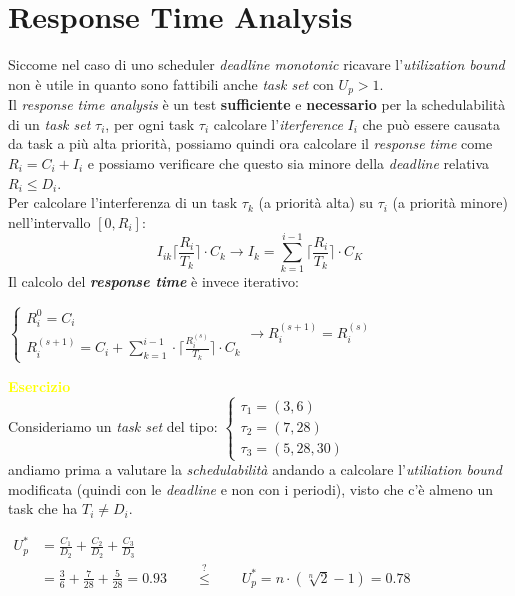 \section{Response Time Analysis}
Siccome nel caso di uno scheduler \textit{deadline monotonic} ricavare l'\textit{utilization bound} non è utile in quanto sono fattibili anche \textit{task set} con $U_p > 1$. \\
Il \textit{response time analysis} è un test \textbf{sufficiente} e \textbf{necessario} per la schedulabilità di un \textit{task set} $\tau_i$, per ogni task $\tau_i$ calcolare l'\textit{iterference} $I_i$ che può essere causata da task a più alta priorità, possiamo quindi ora calcolare il \textit{response time} come $R_i = C_i + I_i$ e possiamo verificare che questo sia minore della \textit{deadline} relativa $R_i \leq D_i$. \\
Per calcolare l'interferenza di un task $\tau_k$ (a priorità alta) su $\tau_i$ (a priorità minore) nell'intervallo $[0, R_i]$: \[ I_{ik} \lceil \frac{R_i}{T_k} \rceil \cdot C_k \rightarrow I_k = \sum_{k=1}^{i-1} \lceil \frac{R_i}{T_k} \rceil \cdot C_K \]
Il calcolo del \textbf{\textit{response time}} è invece iterativo:
\begin{center}
    \begin{math}
        \begin{cases}
            R_i^0 = C_i \\
            R_i^{(s+1)} = C_i + \sum_{k=1}^{i-1} \cdot \lceil \frac{R_i^{(s)}}{T_k} \rceil \cdot C_k
        \end{cases}
        \rightarrow R_i^{(s+1)} = R_i^{(s)}
    \end{math}
\end{center}
\newpage
\textcolor{yellow}{\textbf{Esercizio}} \\
Consideriamo un \textit{task set} del tipo:
\begin{math}
    \begin{cases}
        \tau_1 = (3, 6) \\
        \tau_2 = (7, 28) \\
        \tau_3 = (5, 28, 30)
    \end{cases}
\end{math} \\ \newline
andiamo prima a valutare la \textit{schedulabilità} andando a calcolare l'\textit{utiliation bound} modificata (quindi con le \textit{deadline} e non con i periodi), visto che c'è almeno un task che ha $T_i \neq D_i$.
\begin{center}
    \begin{math}
        \begin{aligned}
            U_p^* &= \frac{C_1}{D_2} + \frac{C_2}{D_2} + \frac{C_3}{D_3} \\
            &= \frac{3}{6} + \frac{7}{28} + \frac{5}{28} = 0.93 \qquad \stackrel{\text{?}}{\leq} \qquad U_p^* = n \cdot (\sqrt[n]2 - 1) = 0.78\\
        \end{aligned}
    \end{math}
\end{center}
